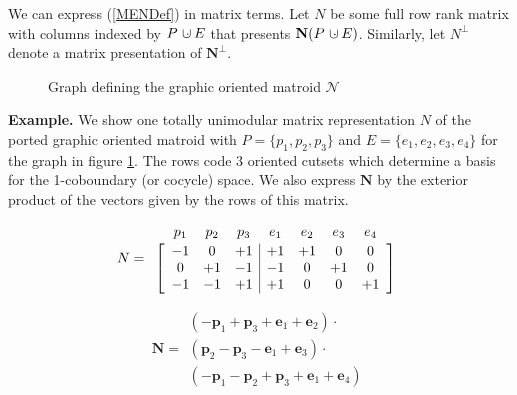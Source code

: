 \documentclass[12pt]{article}
\theoremstyle{definition}
\newcommand{\dunion}
{\mbox{\hbox{\hskip6pt$\cdot$\hskip-5.50pt$\cup$\hskip2pt}}}
\newcommand{\ext}[1]{\ensuremath{\mathbf{#1}}}
\begin{document}
We can express  (\ref{MENDef}) in matrix terms.
Let $N$ be some full row rank matrix with columns indexed
by $P\dunion E$ that presents $\ext{N}(P\dunion E)$.
Similarly, let $N^{\perp}$ denote a matrix presentation
of $\ext{N}^{\perp}$.

\begin{figure}
\begin{center}\end{center}
\caption{Graph defining the graphic oriented matroid $\mathcal{N}$}
\label{K4figure}
\end{figure}

\textbf{Example.} 
We show one totally unimodular matrix
representation $N$ of the 
ported graphic oriented matroid with $P=\{p_1,p_2,p_3\}$
and $E=\{e_1,e_2,e_3,e_4\}$ for the graph in figure \ref{K4figure}.
The rows code 3 oriented cutsets 
which determine 
a basis for the 1-coboundary (or cocycle) space.  We also
express $\ext{N}$ by the exterior 
product 
of the vectors given by the rows of this matrix.


\[
N=\begin{array}{c}
\begin{array}{ccccccc}
p_1 & p_2 & p_3 & e_1 & e_2 & e_3 & e_4 \\[-1em]
\hphantom{+1} & \hphantom{+1} &\hphantom{+1} &\hphantom{+1} &\hphantom{+1} &\hphantom{+1} &\hphantom{+1} 
\end{array} \\ 
\left[\begin{array}{ccc|cccc}
 -1 &  0  &  +1 & +1  &  +1 &  0  & 0   \\ 
  0 & +1  &  -1 & -1  &   0 & +1  & 0   \\ 
 -1 & -1  &  +1 & +1  &   0 &  0  &+1  
\end{array}\right]
  \end{array}
\]

\[
\ext{N}=
\begin{array}{c}
(-\ext{p}_1+\ext{p}_3+\ext{e}_1+\ext{e}_2)\cdot\\
(\ext{p}_2-\ext{p}_3-\ext{e}_1+\ext{e}_3)\cdot\\
(-\ext{p}_1-\ext{p}_2+\ext{p}_3+\ext{e}_1+\ext{e}_4)
\end{array}
\]
\end{document}
